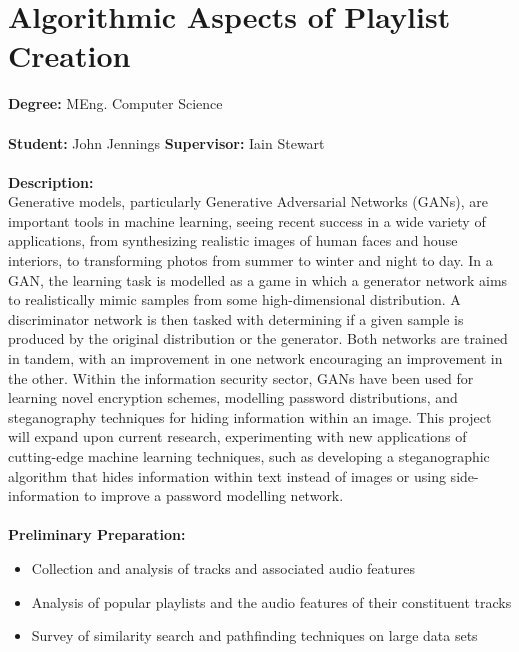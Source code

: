 \documentclass[10pt]{article}
\begin{document}
\newcommand{\bi}{\begin{itemize}}
\newcommand{\ei}{\end{itemize}}

\section*{Algorithmic Aspects of Playlist Creation}

\bigskip

{\bf Degree:} MEng. Computer Science \\
\\ 
{\bf Student:} John Jennings  \hspace{3mm} {\bf Supervisor:} Iain Stewart \\
\\ 
{\bf Description:} \vspace{1mm} \\
Generative models, particularly Generative Adversarial Networks (GANs), are important tools in machine learning, seeing recent success in a wide variety of applications, from synthesizing realistic images of human faces and house interiors, to transforming photos from summer to winter and night to day. In a GAN, the learning task is modelled as a game in which a generator network aims to realistically mimic samples from some high-dimensional distribution. A discriminator network is then tasked with determining if a given sample is produced by the original distribution or the generator. Both networks are trained in tandem, with an improvement in one network encouraging an improvement in the other. Within the information security sector, GANs have been used for learning novel encryption schemes, modelling password distributions, and steganography techniques for hiding information within an image. This project will expand upon current research, experimenting with new applications of cutting-edge machine learning techniques, such as developing a steganographic algorithm that hides information within text instead of images or using side-information to improve a password modelling network.\\
\\
{\bf Preliminary Preparation:}
  \begin{itemize}
    \item Collection and analysis of tracks and associated audio features
    \item Analysis of popular playlists and the audio features of their constituent tracks 
    \item Survey of similarity search and pathfinding techniques on large data sets
  \end{itemize}
\end{document}
